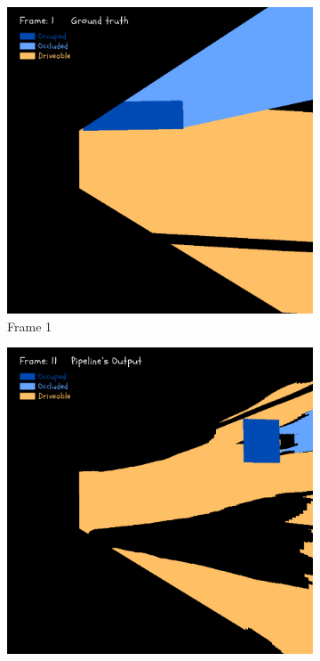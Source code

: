 \begin{figure}[htbp]
\begin{subfigure}[b]{0.19\linewidth}
        \includegraphics[width=\linewidth]{images/experiments/occ2_masks/gt_occ_mask_colored_1.png}
        \caption{Frame 1}
        \label{subfig:occ_masks_frame1}
    \end{subfigure}
    \hfill %
    \begin{subfigure}[b]{0.19\linewidth}
        \centering
        \includegraphics[width=\linewidth]{images/experiments/occ2_masks/dt_occ_mask_colored_11.png}

\end{subfigure}
\end{figure}
